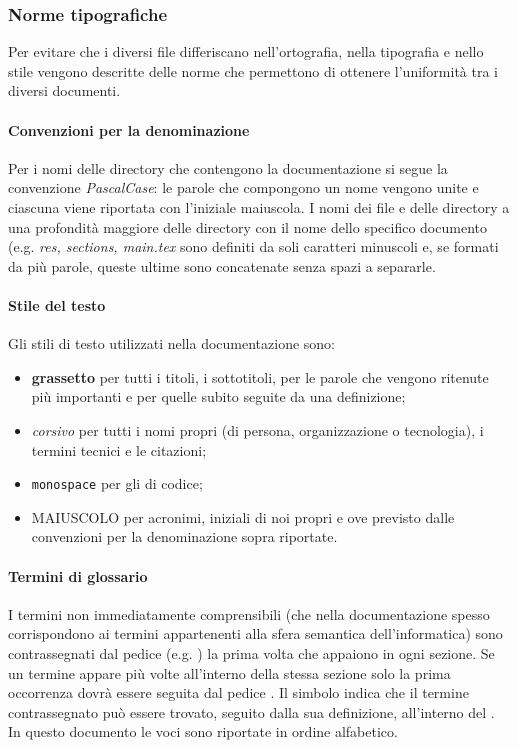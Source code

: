 \subsubsection{Norme tipografiche} \label{_normetipografiche}
Per evitare che i diversi file differiscano nell'ortografia, nella tipografia e nello stile vengono descritte delle norme che permettono di ottenere l'uniformità tra i diversi documenti.

\paragraph{Convenzioni per la denominazione}
Per i nomi delle directory che contengono la documentazione si segue la convenzione \textit{PascalCase}: le parole che compongono un nome vengono unite e ciascuna viene riportata con l'iniziale maiuscola. I nomi dei file  e delle directory a una profondità maggiore delle directory con il nome dello specifico documento (e.g. \textit{res, sections, main.tex} sono definiti da soli caratteri minuscoli e, se formati da più parole, queste ultime sono concatenate senza spazi a separarle. 

\paragraph{Stile del testo}
Gli stili di testo utilizzati nella documentazione sono:
\begin{itemize}
\item\textbf{grassetto} per tutti i titoli, i sottotitoli, per le parole che vengono ritenute più importanti e per quelle subito seguite da una definizione;
\item \textit{corsivo} per tutti i nomi propri (di persona, organizzazione o tecnologia), i termini tecnici e le citazioni;
\item \texttt{monospace} per gli  di codice;
\item MAIUSCOLO per acronimi, iniziali di noi propri e ove previsto dalle convenzioni per la denominazione sopra riportate.
\end{itemize}

\paragraph{Termini di glossario}
I termini non immediatamente comprensibili (che nella documentazione spesso corrispondono ai termini appartenenti alla sfera semantica dell'informatica) sono contrassegnati dal pedice \glock{} (e.g. ) la prima volta che appaiono in ogni sezione. Se un termine appare più volte all'interno della stessa sezione solo la prima occorrenza dovrà essere seguita dal pedice \glock{}. Il simbolo indica che il termine contrassegnato può essere trovato, seguito dalla sua definizione, all'interno del . In questo documento le voci sono riportate in ordine alfabetico.  

